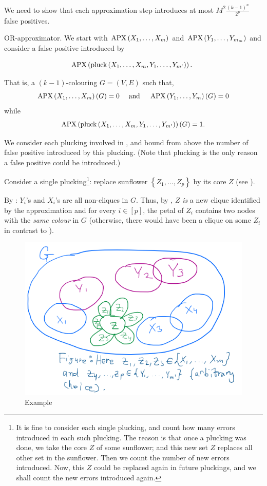 We need to show that each approximation step introduces at most $M^2 \frac{(k-1)^n}{2^p}$ false positives.


  OR-approximator.
We start with $\mathrm{APX}\left(X_1, \ldots, X_m\right)$ and 
$\operatorname{\mathrm{APX}}\left(Y_1, \ldots, Y_{m_m}\right)$ and consider a false positive introduced by

$$
\operatorname{\mathrm{APX}}\left(\text{pluck}\left(X_1, \ldots, X_m, Y_1, \ldots, Y_{m^{\prime}}\right)\right) \text {. }
$$


That is, a $(k-1)$-colouring $G=(V, E)$ such that,
\begin{equation}\label{eq:991:24}
\operatorname{\mathrm{APX}}\left(X_1, \ldots, X_m\right)(G)=0 
\quad \text{ and } ~~~\operatorname{\mathrm{APX}}\left(Y_1, \ldots, Y_m\right)(G)=0
\end{equation}
while 
\begin{equation}\label{eq:960:30}
\operatorname{\mathrm{APX}}\left(\operatorname{pluck}\left(X_1, \ldots, X_m, Y_1, \ldots, Y_{m^{\prime}}\right)\right)(G)=1 .
\end{equation}

We consider each plucking involved in , and bound from above the number of false positive introduced by this plucking. (Note that plucking is the only reason a false positive could be introduced.)


Consider a single plucking\footnote{It is fine to consider each single plucking, and count how many errors introduced in each such plucking. The reason is that once a plucking was done, we take the core $Z$ of some sunflower; and this new set $Z$ replaces all other set in the sunflower. Then we count the number of new errors introduced. Now, this $Z$ could  be replaced again in future pluckings, and we shall count the new errors introduced again.}: 
replace sunflower $\left\{Z_1, \ldots, Z_p\right\}$ by its core $Z$ (see ).

By : $Y_i$'s and $X_i$'s are all non-cliques in $G$.
Thus, by , $Z$ \emph{is} a new  clique
identified by the approximation and for every $i\in[p]$, the petal of $Z_i$ contains two nodes with the \emph{same colour} in $G$ (otherwise, there would have been a clique on some $Z_i$ in contrast to ).

\begin{figure}[H]
    \centering
    \includegraphics[width=.6\linewidth]{images/clique3.png}
    \caption{Example}
    \label{fig:pluck-stage}
\end{figure}


